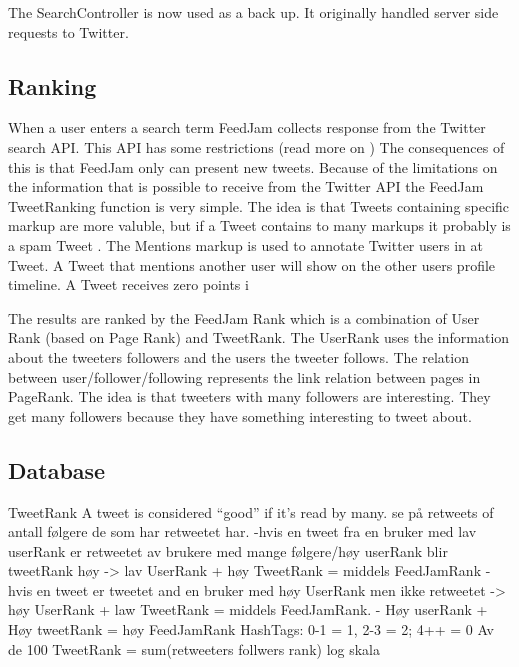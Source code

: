 The SearchController is now used as a back up. It originally handled server side requests to Twitter. %




\subsection{Ranking} %
\label{ranking}
When a user enters a search term FeedJam collects response from the Twitter search API. This API has some restrictions (read more on )%
The consequences of this is that FeedJam only can present new tweets. Because of the limitations on the information that is possible to receive from the Twitter API the FeedJam TweetRanking function is very simple. The idea is that Tweets containing specific markup are more valuble, but if a Tweet contains to many markups it probably is a spam Tweet \citep{}.%
The Mentions markup is used to annotate Twitter users in at Tweet. A Tweet that mentions another user will show on the other users profile timeline.
A Tweet receives zero points i

The results are ranked by the FeedJam Rank which is a combination of User Rank (based on Page Rank) and TweetRank. The UserRank uses the information about the tweeters followers and the users the tweeter follows. The relation between user/follower/following represents the link relation between pages in PageRank. The idea is that tweeters with many followers are interesting. They get many followers because they have something interesting to tweet about. 

\subsection{Database} %
\label{feedJamDatabase}




TweetRank
A tweet is considered “good” if it’s read by many. 
se på retweets of antall følgere de som har retweetet har.
-hvis en tweet fra en bruker med lav userRank er retweetet av brukere med mange følgere/høy userRank blir tweetRank høy -> lav UserRank + høy TweetRank = middels FeedJamRank
-hvis en tweet er tweetet and en bruker med høy UserRank men ikke retweetet -> høy UserRank + law TweetRank = middels FeedJamRank.
- Høy userRank + Høy tweetRank = høy FeedJamRank
HashTags: 0-1 = 1, 2-3 = 2; 4++ = 0
Av de 100
TweetRank = sum(retweeters follwers rank)
log skala

